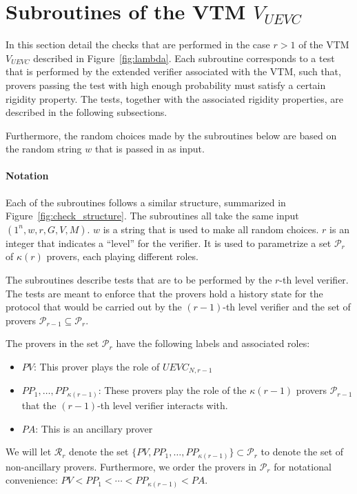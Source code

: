 
\section{Subroutines of the VTM $V_{UEVC}$}

In this section detail the checks that are performed in the case $r>1$ of the VTM $V_{UEVC}$ described in Figure~\ref{fig:lambda}. Each subroutine corresponds to a test that is performed by the extended verifier associated with the VTM, such that, provers passing the test with high enough probability must satisfy a certain rigidity property. The tests, together with the associated rigidity properties, are described in the following subsections. 

Furthermore, the random choices made by the subroutines below are based on the random string $w$ that is passed in as input. 

\paragraph{Notation} Each of the subroutines follows a similar structure, summarized in Figure~\ref{fig:check_structure}. The subroutines all take the same input $(1^n,w,r,G,V,M)$. $w$ is a string that is used to make all random choices. $r$ is an integer that indicates a ``level'' for the verifier. It is used to parametrize a set $\mathcal{P}_r$ of $\kappa(r)$ provers, each playing different roles. 

The subroutines describe tests that are to be performed by the $r$-th level verifier. The tests are meant to enforce that the provers hold a history state for the protocol that would be carried out by the $(r-1)$-th level verifier and the set of provers $\mathcal{P}_{r-1} \subseteq \mathcal{P}_r$. 

The provers in the set $\mathcal{P}_r$ have the following labels and associated roles:
\begin{itemize}
	\item $PV$: This prover plays the role of $UEVC_{N,r-1}$
	\item $PP_1,\ldots,PP_{\kappa(r-1)}$: These provers play the role of the $\kappa(r-1)$ provers $\mathcal{P}_{r-1}$ that the $(r-1)$-th level verifier interacts with.
	\item $PA$: This is an ancillary prover
\end{itemize}
We will let $\mathcal{R}_r$ denote the set $\{PV,PP_1,\ldots,PP_{\kappa(r-1)} \} \subset \mathcal{P}_r$ to denote the set of non-ancillary provers. Furthermore, we order the provers in $\mathcal{P}_r$ for notational convenience: $PV < PP_1 < \cdots < PP_{\kappa(r-1)} < PA$. 

